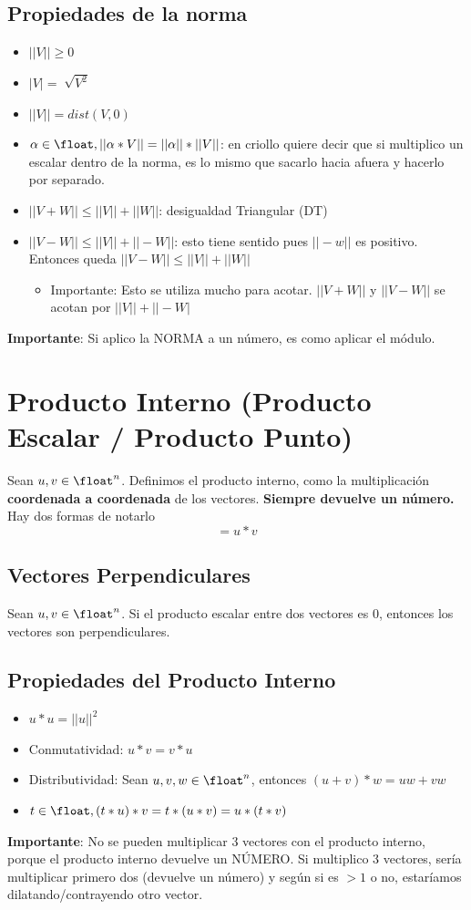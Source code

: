 \documentclass[10pt,a4paper]{article}
\begin{document}
\subsection*{Propiedades de la norma}
\begin{itemize}
    \item $||V||  \ge  0$
    \item $|V| = \sqrt[]{V^{2}}$
    \item $||V|| = dist(V, 0)$
    \item $\alpha \in \float, ||\alpha * V|| = ||\alpha|| * ||V||$: en criollo quiere decir que si multiplico un escalar dentro de la norma, es lo mismo que sacarlo hacia afuera y hacerlo por separado. 
    \item $||V+W|| \le ||V|| + ||W||$: desigualdad Triangular (DT)
    \item $||V-W|| \le ||V|| + ||-W||$: esto tiene sentido pues $||-w||$ es positivo. Entonces queda $||V-W|| \le ||V|| + ||W||$
    \begin{itemize}
        \item Importante: Esto se utiliza mucho para acotar. $ ||V+W||$ y $||V-W||$ se acotan por $ ||V|| + ||-W|$
    \end{itemize}
\end{itemize}
\textbf{Importante}: Si aplico la NORMA a un número, es como aplicar el módulo.
\section*{Producto Interno (Producto Escalar / Producto Punto)}
Sean $u, v \in \float^{n}$. Definimos el producto interno, como la multiplicación \textbf{coordenada a coordenada} de los vectores. \textbf{Siempre devuelve un número.} \\
Hay dos formas de notarlo
\[<u,v> = u * v\]
\subsection*{Vectores Perpendiculares}
Sean $u, v \in \float^{n}$. Si el producto escalar entre dos vectores es 0, entonces los vectores son perpendiculares.
\subsection*{Propiedades del Producto Interno}
\begin{itemize}
    \item $u * u = ||u||^{2}$
    \item Conmutatividad: $u * v = v * u$
    \item Distributividad: Sean $u, v, w \in \float^{n}$, entonces $(u+v) * w = uw + vw$ 
    \item $ t \in \float, (t * u) * v = t * (u * v) = u * (t * v)$
\end{itemize}
\textbf{Importante}: No se pueden multiplicar 3 vectores con el producto interno, porque el producto interno devuelve un NÚMERO. Si multiplico 3 vectores, sería multiplicar primero dos (devuelve un número) y según si es $ > 1 $ o no, estaríamos dilatando/contrayendo otro vector. 
\end{document}
